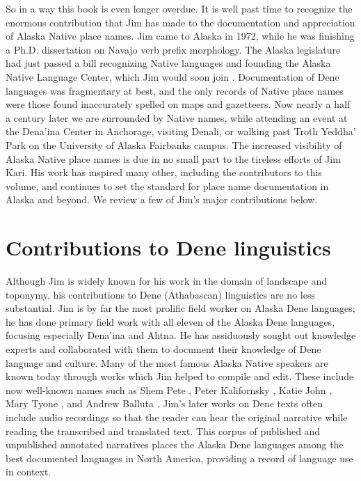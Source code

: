 So in a way this book is even longer overdue. It is well past time to recognize the enormous contribution that Jim has made to the documentation and appreciation of Alaska Native place names. Jim came to Alaska in 1972, while he was finishing a Ph.D. dissertation on Navajo verb prefix morphology. The Alaska legislature had just passed a bill recognizing Native languages and founding the Alaska Native Language Center, which Jim would soon join \citep{krauss1974}. Documentation of Dene languages was fragmentary at best, and the only records of Native place names were those found inaccurately spelled on maps and gazetteers. Now nearly a half a century later we are surrounded by Native names, while attending an event at the Dena'ina Center in Anchorage, visiting Denali, or walking past Troth Yeddha' Park on the University of Alaska Fairbanks campus. The increased visibility of Alaska Native place names is due in no small part to the tireless efforts of Jim Kari. His work has inspired many other, including the contributors to this volume, and continues to set the standard for place name documentation in Alaska and beyond. We review a few of Jim's major contributions below.

\section{Contributions to Dene linguistics}
Although Jim is widely known for his work in the domain of landscape and toponymy, his contributions to Dene (Athabascan) linguistics are no less substantial. Jim is by far the most prolific field worker on Alaska Dene languages; he has done primary field work with all eleven of the Alaska Dene languages, focusing especially Dena’ina and Ahtna. He has assiduously sought out knowledge experts and collaborated with them to document their knowledge of Dene language and culture. Many of the most famous Alaska Native speakers are known today through works which Jim helped to compile and edit. These include now well-known names such as Shem Pete \citealt{kari1987,kari2004a}, Peter Kalifornsky \citep{kari1991a}, Katie John \citep{kari1986a}, Mary Tyone \citep{tyone1996}, and Andrew Balluta \citep{balluta2008}. Jim's later works on Dene texts often include audio recordings so that the reader can hear the original narrative while reading the transcribed and translated text. This corpus of published and unpublished annotated narratives places the Alaska Dene languages among the best documented languages in North America, providing a record of language use in context.

